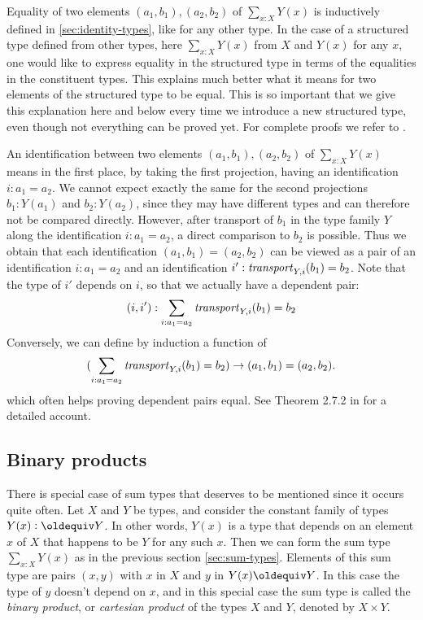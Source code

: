 Equality of two elements $(a_1,b_1),(a_2,b_2)$ of $\sum _{x:X} Y(x)$ is 
inductively defined in \cref{sec:identity-types}, like for any other type.
In the case of a structured type defined from other types, 
here $\sum _{x:X} Y(x)$ from $X$ and $Y(x)$ for any $x$,
one would like to express equality in the structured type in terms of 
the equalities in the constituent types. This explains much better
what it means for two elements of the structured type to be equal.
This is so important that we give this explanation here and below
every time we introduce a new structured type, even though not everything
can be proved yet. For complete proofs we refer to \cite{hottbook}.

An identification between two elements $(a_1,b_1),(a_2,b_2)$ of 
$\sum _{x:X} Y(x)$ means in the first place, by taking
the first projection, having an identification $i: a_1=a_2$.
We cannot expect exactly the same for the second 
projections $b_1: Y(a_1)$ and $b_2: Y(a_2)$, since they may
have different types and can therefore not be compared directly.
However, after transport of $b_1$ in the type family $Y$
along the identification $i: a_1=a_2$, a direct comparison to $b_2$
is possible. Thus we obtain that each identification $(a_1,b_1)=(a_2,b_2)$
can be viewed as a pair of an identification $i: a_1=a_2$ and an
identification $i' : \mathord{\mathit{transport}}_{Y,i}(b_1) = b_2$. Note that the type
of $i'$ depends on $i$, so that we actually have a dependent pair:
\[
(i,i'): \sum_{i:a_1 = a_2} \mathord{\mathit{transport}}_{Y,i}(b_1)= b_2
\]
Conversely, we can define by induction a function of
\[
(\sum_{i:a_1 = a_2} \mathord{\mathit{transport}}_{Y,i}(b_1)= b_2) \to (a_1,b_1)=(a_2,b_2).
\]
which often helps proving dependent pairs equal.
See Theorem 2.7.2 in \cite{hottbook} for a detailed account.


\subsection{Binary products}
\label{sec:binprod-types}
There is special case of sum types that deserves to be mentioned since
it occurs quite often. Let $X$ and $Y$ be types, and consider the constant
family of types $Y(x)\defeq Y$. In other words, $Y(x)$ is a type that depends
on an element $x$ of $X$ that happens to be $Y$ for any such $x$.
Then we can form the sum type $\sum_{x:X} Y(x)$ as in the previous
section \ref{sec:sum-types}. Elements of this sum type are pairs $(x,y)$
with $x$ in $X$ and $y$ in $Y(x)\jdeq Y$. In this case the type of $y$
doesn't depend on $x$, and in this special case the sum type is called
the \emph{binary product}, or \emph{cartesian product} of the types $X$ and $Y$,
denoted by $X \times Y$.

